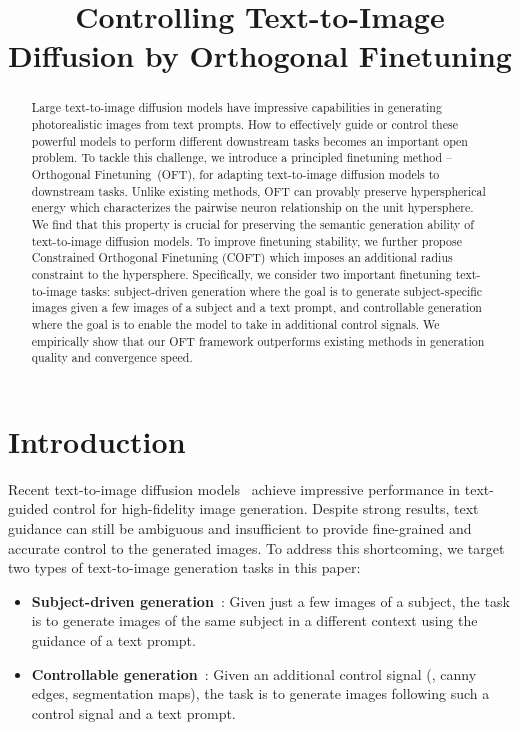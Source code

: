 \title{Controlling Text-to-Image Diffusion by Orthogonal Finetuning}

\begin{abstract}
\vspace{-0.5mm}
Large text-to-image diffusion models have impressive capabilities in generating photorealistic images from text prompts. How to effectively guide or control these powerful models to perform different downstream tasks becomes an important open problem. To tackle this challenge, we introduce a principled finetuning method -- Orthogonal Finetuning~(OFT), for adapting text-to-image diffusion models to downstream tasks. Unlike existing methods, OFT can provably preserve hyperspherical energy which characterizes the pairwise neuron relationship on the unit hypersphere. We find that this property is crucial for preserving the semantic generation ability of text-to-image diffusion models. To improve finetuning stability, we further propose Constrained Orthogonal Finetuning (COFT) which imposes an additional radius constraint to the hypersphere. Specifically, we consider two important finetuning text-to-image tasks: subject-driven generation where the goal is to generate subject-specific images given a few images of a subject and a text prompt, and controllable generation where the goal is to enable the model to take in additional control signals. We empirically show that our OFT framework outperforms existing methods in generation quality and convergence speed.
\end{abstract}

\section{Introduction}
\vspace{-1mm}

Recent text-to-image diffusion models~\cite{saharia2022photorealistic,ramesh2022hierarchical,rombach2022high} achieve impressive performance in text-guided control for high-fidelity image generation. Despite strong results, text guidance can still be ambiguous and insufficient to provide fine-grained and accurate control to the generated images. To address this shortcoming, we target two types of text-to-image generation tasks in this paper:

\vspace{0.5mm}
\begin{itemize}[leftmargin=*,nosep]
\setlength\itemsep{0.4em}
    \item \textbf{Subject-driven generation}~\cite{ruiz2023dreambooth}: Given just a few images of a subject, the task is to generate images of the same subject in a different context using the guidance of a text prompt.
    \item \textbf{Controllable generation}~\cite{zhang2023adding,mou2023t2i}: Given an additional control signal (\eg, canny edges, segmentation maps), the task is to generate images following such a control signal and a text prompt.
\end{itemize}
\vspace{0.5mm}

